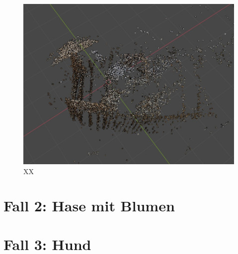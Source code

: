 \begin{figure}
    \includegraphics[width=\textwidth]{src/img/chair_model_2.jpg}
    \caption{XX}
    \label{fig:chair-model}
\end{figure}


\section{Fall 2: Hase mit Blumen}
\section{Fall 3: Hund}
